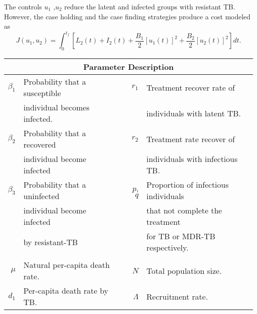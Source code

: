 	The controls $u_1$ ,$u_2$ reduce the latent and infected 
groups with resistant TB. However, the case holding and the case finding 
strategies produce a cost modeled as
\begin{equation}\label{eqn:MDR-TB_action}
	 J(u_1, u_2) =
		 \int_0 ^ {t_f}
			 \left[
				 L_2(t) + I_2(t) 
				 + \frac{B_1}{2} [u_1(t)] ^ 2
				 + \frac{B_2}{2} [u_2(t)] ^ 2
			 \right]dt.
\end{equation}
%
%
\begin{table}[htb]
  \centering
  \begin{tabular}{rllrl}
    \toprule
       \multicolumn{5}{c}{\textbf{Parameter Description}}\\
        \midrule
        $\beta_1$ 
            & Probability that a susceptible 
        &&
          $r_1$ 
            & 
            Treatment recover rate of 
        \\
         & individual becomes infected.
           &&&
            individuals with latent TB.
        \\
        $\beta_2$ 
          & Probability that a recovered 
        && 
          $r_2$ 
            &
            Treatment rate recover of 
          \\
          & individual  become infected
            &&&
              individuals with infectious TB.
          \\
        $\beta_3$ 
          & Probability that a uninfected 
          &&
          $p$, $q$
          & 
            Proportion of infectious individuals 
          \\
          & individual become infected 
            &&&
              that not complete the treatment
            \\
          & by resistant-TB 
            &&&
              for TB or MDR-TB respectively.
      \\
      \\
        $\mu$ 
          & Natural per-capita death rate.
          &&
            $N$ 
            &
              Total population size.
      \\
        $d_1$ 
          & Per-capita death rate by TB.
          &&
            $\Lambda$
            & Recruitment rate.
              

\end{tabular}
\end{table}

